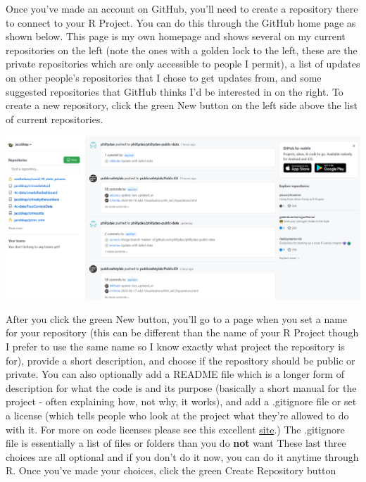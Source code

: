 \documentclass[
  12pt,
  openany]{book}
\begin{document}
Once you've made an account on GitHub, you'll need to create a repository there to connect to your R Project. You can do this through the GitHub home page as shown below. This page is my own homepage and shows several on my current repositories on the left (note the ones with a golden lock to the left, these are the private repositories which are only accessible to people I permit), a list of updates on other people's repositories that I chose to get updates from, and some suggested repositories that GitHub thinks I'd be interested in on the right. To create a new repository, click the green New button on the left side above the list of current repositories.

\includegraphics{images/Github_new_repo.PNG}

After you click the green New button, you'll go to a page when you set a name for your repository (this can be different than the name of your R Project though I prefer to use the same name so I know exactly what project the repository is for), provide a short description, and choose if the repository should be public or private. You can also optionally add a README file which is a longer form of description for what the code is and its purpose (basically a short manual for the project - often explaining how, not why, it works), and add a .gitignore file or set a license (which tells people who look at the project what they're allowed to do with it. For more on code licenses please see this excellent \href{https://choosealicense.com/}{site}.) The .gitignore file is essentially a list of files or folders than you do \textbf{not} want These last three choices are all optional and if you don't do it now, you can do it anytime through R. Once you've made your choices, click the green Create Repository button
\end{document}
